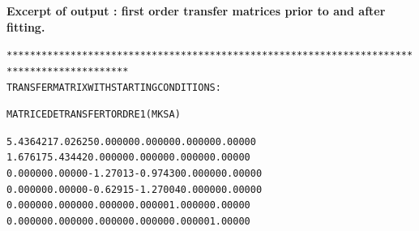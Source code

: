 \begin{center}

\clearpage

\twocolumn
\noindent \textbf{\normalsize Excerpt of \zgoubi output : 
 first order transfer matrices prior to and after fitting.
}

\begin{scriptsize}
\begin{alltt}
*******************************************************************************************
 TRANSFER MATRIX WITH STARTING  CONDITIONS :


                  MATRICE  DE  TRANSFERT  ORDRE  1  ( MKSA )

         5.43642  17.02625   0.00000   0.00000   0.00000   0.00000
         1.67617   5.43442   0.00000   0.00000   0.00000   0.00000
         0.00000   0.00000  -1.27013  -0.97430   0.00000   0.00000
         0.00000   0.00000  -0.62915  -1.27004   0.00000   0.00000
         0.00000   0.00000   0.00000   0.00000   1.00000   0.00000
         0.00000   0.00000   0.00000   0.00000   0.00000   1.00000



\end{alltt}
\end{scriptsize}
\end{center}
